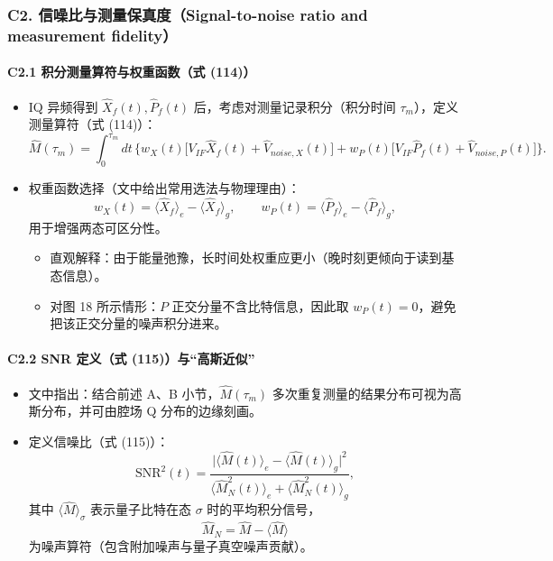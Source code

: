 \documentclass[12pt,a4paper,oneside]{ctexbook}
\providecommand{\tightlist}{%
  \setlength{\itemsep}{0pt}\setlength{\parskip}{0pt}}
\let\oldparagraph\paragraph
\renewcommand{\paragraph}[1]{\oldparagraph{#1}\mbox{}}
\begin{document}
\subsubsection{C2. 信噪比与测量保真度（Signal-to-noise ratio and measurement
fidelity）}\label{c2.-ux4fe1ux566aux6bd4ux4e0eux6d4bux91cfux4fddux771fux5ea6signal-to-noise-ratio-and-measurement-fidelity}

\paragraph{C2.1 积分测量算符与权重函数（式
(114)）}\label{c2.1-ux79efux5206ux6d4bux91cfux7b97ux7b26ux4e0eux6743ux91cdux51fdux6570ux5f0f-114}

\begin{itemize}
\tightlist
\item
  IQ 异频得到 \(\hat{X}_f(t),\hat{P}_f(t)\)
  后，考虑对测量记录积分（积分时间 \(\tau_m\)），定义测量算符（式
  (114)）： \[
  \hat{M}(\tau_m)=\int_0^{\tau_m}dt\,\Big\{
  w_X(t)\big[V_{IF}\hat{X}_f(t)+\hat{V}_{noise,X}(t)\big]
  +w_P(t)\big[V_{IF}\hat{P}_f(t)+\hat{V}_{noise,P}(t)\big]
  \Big\}.
  \]
\item
  权重函数选择（文中给出常用选法与物理理由）： \[
  w_X(t)=\langle \hat{X}_f\rangle_e-\langle \hat{X}_f\rangle_g,\qquad
  w_P(t)=\langle \hat{P}_f\rangle_e-\langle \hat{P}_f\rangle_g,
  \] 用于增强两态可区分性。

  \begin{itemize}
  \tightlist
  \item
    直观解释：由于能量弛豫，长时间处权重应更小（晚时刻更倾向于读到基态信息）。
  \item
    对图 18 所示情形：\(P\) 正交分量不含比特信息，因此取
    \(w_P(t)=0\)，避免把该正交分量的噪声积分进来。
  \end{itemize}
\end{itemize}

\paragraph{C2.2 SNR 定义（式
(115)）与``高斯近似''}\label{c2.2-snr-ux5b9aux4e49ux5f0f-115ux4e0eux9ad8ux65afux8fd1ux4f3c}

\begin{itemize}
\tightlist
\item
  文中指出：结合前述 A、B 小节，\(\hat{M}(\tau_m)\)
  多次重复测量的结果分布可视为高斯分布，并可由腔场 Q 分布的边缘刻画。
\item
  定义信噪比（式 (115)）： \[
  \mathrm{SNR}^2(t)=
  \frac{\big|\langle \hat{M}(t)\rangle_e-\langle \hat{M}(t)\rangle_g\big|^2}
  {\langle \hat{M}_N^2(t)\rangle_e+\langle \hat{M}_N^2(t)\rangle_g},
  \] 其中 \(\langle \hat{M}\rangle_\sigma\) 表示量子比特在态 \(\sigma\)
  时的平均积分信号， \[
  \hat{M}_N=\hat{M}-\langle \hat{M}\rangle
  \] 为噪声算符（包含附加噪声与量子真空噪声贡献）。
\end{itemize}
\end{document}
